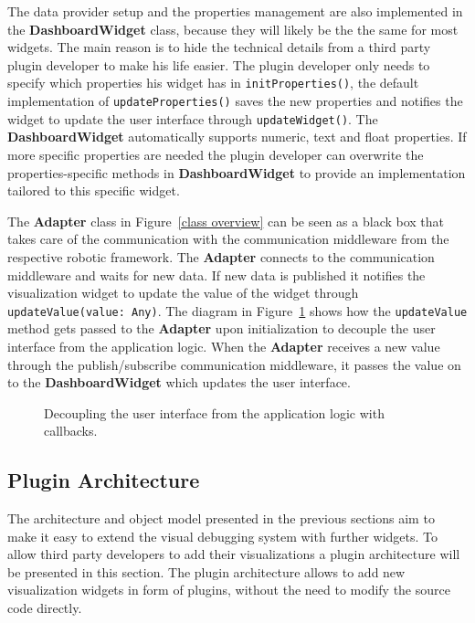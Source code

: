The data provider setup and the properties management are also implemented in the \textbf{DashboardWidget} class, because they will likely be the the same for most widgets. The main reason is to hide the technical details from a third party plugin developer to make his life easier. The plugin developer only needs to specify which properties his widget has in \verb+initProperties()+, the default implementation of \verb+updateProperties()+ saves the new properties and notifies the widget to update the user interface through \verb+updateWidget()+. The \textbf{DashboardWidget} automatically supports numeric, text and float properties. If more specific properties are needed the plugin developer can overwrite the properties-specific methods in \textbf{DashboardWidget} to provide an implementation tailored to this specific widget.

The \textbf{Adapter} class in Figure~\ref{class overview} can be seen as a black box that takes care of the communication with the communication middleware from the respective robotic framework. The \textbf{Adapter} connects to the communication middleware and waits for new data. If new data is published it notifies the visualization widget to update the value of the widget through \verb+updateValue(value: Any)+. The diagram in Figure~\ref{update_value_sequence} shows how the \verb+updateValue+ method gets passed to the \textbf{Adapter} upon initialization to decouple the user interface from the application logic. When the \textbf{Adapter} receives a new value through the publish/subscribe communication middleware, it passes the value on to the \textbf{DashboardWidget} which updates the user interface.

\begin{figure}%
  \centering
  \caption{Decoupling the user interface from the application logic with callbacks.}
  \label{update_value_sequence}
\end{figure}


\subsection{Plugin Architecture}
\label{plugin_architecture_section}
The architecture and object model presented in the previous sections aim to make it easy to extend the visual debugging system with further widgets. To allow third party developers to add their visualizations a plugin architecture will be presented in this section. The plugin architecture allows to add new visualization widgets in form of plugins, without the need to modify the source code directly.


